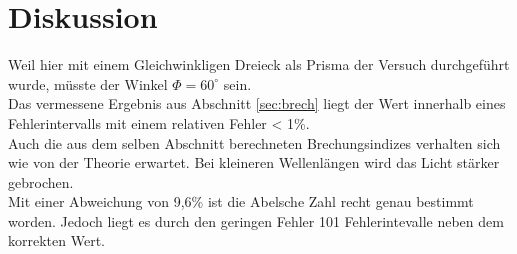 \section{Diskussion}
\label{sec:Diskussion}
Weil hier mit einem Gleichwinkligen Dreieck als Prisma der Versuch durchgeführt wurde, müsste der Winkel $\Phi = 60^\circ$ sein.\\

Das vermessene Ergebnis aus Abschnitt \ref{sec:brech} liegt der Wert innerhalb eines Fehlerintervalls mit einem relativen Fehler < 1\%. \\

Auch die aus dem selben Abschnitt berechneten Brechungsindizes verhalten sich wie von der Theorie erwartet.
Bei kleineren Wellenlängen wird das Licht stärker gebrochen. \\

Mit einer Abweichung von 9,6\% ist die Abelsche Zahl recht genau bestimmt worden.
Jedoch liegt es durch den geringen Fehler 101 Fehlerintevalle neben dem korrekten Wert.